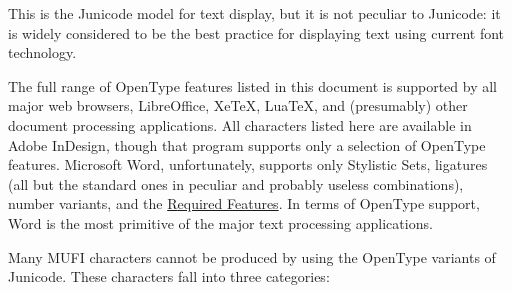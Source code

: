 \documentclass[letterpaper,12pt]{article}
\begin{document}
This is the Junicode model for text display, but it is not peculiar to Junicode: it is widely considered to be the best
practice for displaying text using current font technology.

The full range of OpenType features listed in this document is supported by all major web browsers, LibreOffice, XeTeX,
LuaTeX, and (presumably) other document processing applications. All characters listed here are available in Adobe
InDesign, though that program supports only a selection of OpenType features. Microsoft Word, unfortunately, supports
only Stylistic Sets, ligatures (all but the standard ones in peculiar and probably useless combinations), number
variants, and the \hyperlink{req}{R}\hyperlink{req}{equired }\hyperlink{req}{F}\hyperlink{req}{eatures}. In terms of
OpenType support, Word is the most primitive of the major text processing applications.

Many MUFI characters cannot be produced by using the OpenType variants of Junicode. These characters fall into three
categories:
\end{document}
